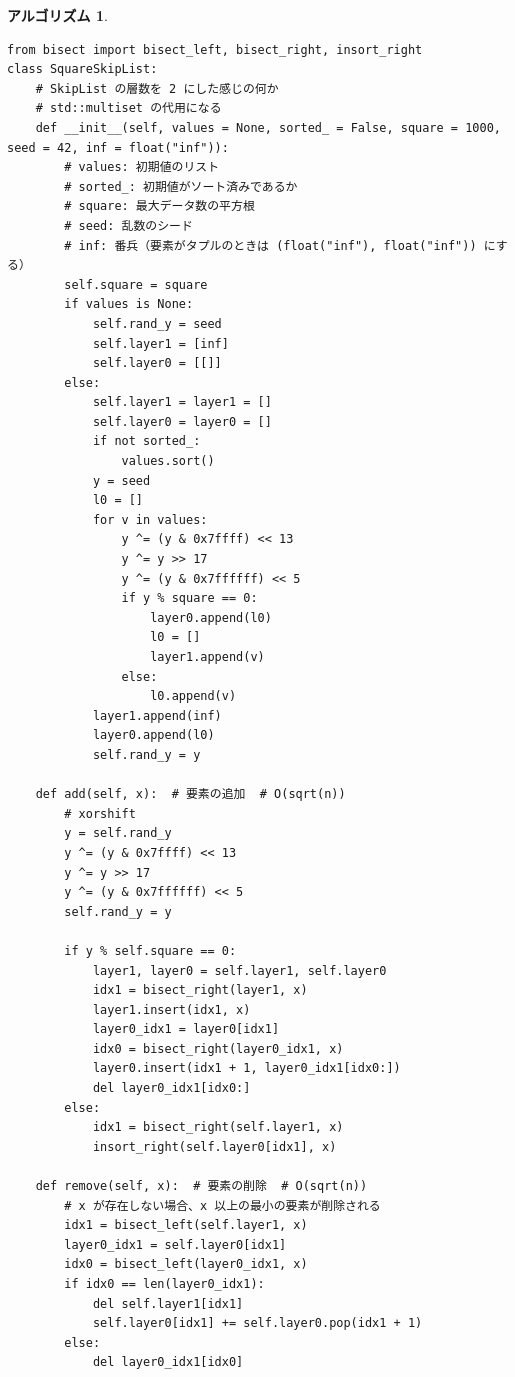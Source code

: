 \documentclass[12pt, a4j]{ltjsarticle}
\newtheorem{alg}[thm]{アルゴリズム}
\begin{document}
\begin{alg}\upshape\quad\\
\begin{lstlisting}
from bisect import bisect_left, bisect_right, insort_right
class SquareSkipList:
    # SkipList の層数を 2 にした感じの何か
    # std::multiset の代用になる
    def __init__(self, values = None, sorted_ = False, square = 1000, seed = 42, inf = float("inf")):
        # values: 初期値のリスト
        # sorted_: 初期値がソート済みであるか
        # square: 最大データ数の平方根
        # seed: 乱数のシード
        # inf: 番兵（要素がタプルのときは (float("inf"), float("inf")) にする）
        self.square = square
        if values is None:
            self.rand_y = seed
            self.layer1 = [inf]
            self.layer0 = [[]]
        else:
            self.layer1 = layer1 = []
            self.layer0 = layer0 = []
            if not sorted_:
                values.sort()
            y = seed
            l0 = []
            for v in values:
                y ^= (y & 0x7ffff) << 13
                y ^= y >> 17
                y ^= (y & 0x7ffffff) << 5
                if y % square == 0:
                    layer0.append(l0)
                    l0 = []
                    layer1.append(v)
                else:
                    l0.append(v)
            layer1.append(inf)
            layer0.append(l0)
            self.rand_y = y

    def add(self, x):  # 要素の追加  # O(sqrt(n))
        # xorshift
        y = self.rand_y
        y ^= (y & 0x7ffff) << 13
        y ^= y >> 17
        y ^= (y & 0x7ffffff) << 5
        self.rand_y = y

        if y % self.square == 0:
            layer1, layer0 = self.layer1, self.layer0
            idx1 = bisect_right(layer1, x)
            layer1.insert(idx1, x)
            layer0_idx1 = layer0[idx1]
            idx0 = bisect_right(layer0_idx1, x)
            layer0.insert(idx1 + 1, layer0_idx1[idx0:])
            del layer0_idx1[idx0:]
        else:
            idx1 = bisect_right(self.layer1, x)
            insort_right(self.layer0[idx1], x)

    def remove(self, x):  # 要素の削除  # O(sqrt(n))
        # x が存在しない場合、x 以上の最小の要素が削除される
        idx1 = bisect_left(self.layer1, x)
        layer0_idx1 = self.layer0[idx1]
        idx0 = bisect_left(layer0_idx1, x)
        if idx0 == len(layer0_idx1):
            del self.layer1[idx1]
            self.layer0[idx1] += self.layer0.pop(idx1 + 1)
        else:
            del layer0_idx1[idx0]


\end{lstlisting}
\end{alg}
\end{document}
